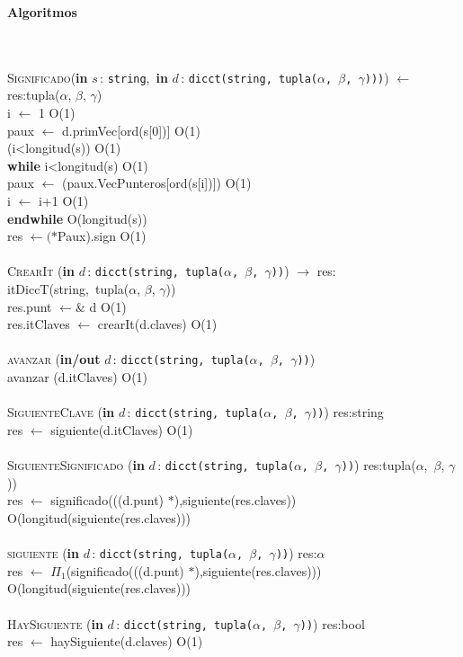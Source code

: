 \documentclass[10pt, a4paper]{article}
\let\NombreFuncion=\textsc
\let\TipoVariable=\texttt
\let\ModificadorArgumento=\textbf
\newcommand{\tab}{\hspace*{7mm}}
\newcommand{\In}[2]{\ModificadorArgumento{in} \ensuremath{#1}\,: \TipoVariable{#2}\xspace}
\newcommand{\Inout}[2]{\ModificadorArgumento{in/out} \ensuremath{#1}\,: \TipoVariable{#2}\xspace}
\newenvironment{Algoritmos}{%
  \vspace*{2ex}%
  \noindent\textbf{\Large Algoritmos}%
  \vspace*{2ex}%
}{}
\begin{document}
\begin{Algoritmos}
\\ \\
\NombreFuncion{Significado}(\In{s}{string},\ \In{d}{dicct(string,\ tupla($\alpha$, $\beta$, $\gamma$)))}) $\leftarrow$ res:tupla($\alpha$, $\beta$, $\gamma$)
\\
\tab i $\leftarrow$	1 \hfill O(1)
\\
\tab paux $\leftarrow$ d.primVec[ord(s[0])] \hfill O(1)
\\
\tab (i<longitud(s)) \hfill O(1)
\\
\tab \textbf{while} i<longitud(s) \hfill O(1)
\\
\tab \tab paux $\leftarrow$ (paux.VecPunteros[ord(s[i])])  \hfill O(1)
\\
\tab \tab i $\leftarrow$ i+1  \hfill O(1)
\\
\tab \textbf{endwhile}  \hfill O(longitud(s))
\\
\tab res $\leftarrow(\ast$Paux).sign \hfill O(1)
\\ \\
\NombreFuncion{CrearIt} (\In{d}{dicct(string,\ tupla($\alpha$,\ $\beta$, $\gamma$))}) $\rightarrow$ res: itDiccT(string,\ tupla($\alpha$, $\beta$, $\gamma$))
\\
\tab res.punt $\leftarrow \&$ d \hfill O(1)
\\
\tab res.itClaves $\leftarrow$ crearIt(d.claves) \hfill O(1)
\\ \\
\NombreFuncion{avanzar} (\Inout{d}{dicct(string,\ tupla($\alpha$,\ $\beta$, $\gamma$))})
\\
\tab avanzar (d.itClaves) \hfill O(1)
\\ \\
\NombreFuncion{SiguienteClave} (\In{d}{dicct(string,\ tupla($\alpha$,\ $\beta$, $\gamma$))}) \rightarrow res:string
\\
\tab res $\leftarrow$ siguiente(d.itClaves) \hfill O(1)
\\ \\
\NombreFuncion{SiguienteSignificado} (\In{d}{dicct(string,\ tupla($\alpha$,\ $\beta$, $\gamma$))}) \rightarrow res:tupla($\alpha$,\ $\beta$, $\gamma$))
\\
\tab res $\leftarrow$ significado(((d.punt) $\ast$),siguiente(res.claves)) \hfill O(longitud(siguiente(res.claves)))
\\ \\
\NombreFuncion{siguiente} (\In{d}{dicct(string,\ tupla($\alpha$,\ $\beta$, $\gamma$))}) \rightarrow res:$\alpha$
\\
\tab res $\leftarrow$ $\Pi_1$(significado(((d.punt) $\ast$),siguiente(res.claves))) \hfill O(longitud(siguiente(res.claves)))
\\ \\
\NombreFuncion{HaySiguiente} (\In{d}{dicct(string,\ tupla($\alpha$,\ $\beta$, $\gamma$))}) \rightarrow res:bool
\\
\tab res $\leftarrow$ haySiguiente(d.claves) \hfill O(1)
\\ \\
\end{Algoritmos}
\end{document}

